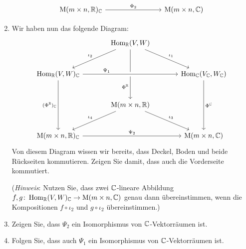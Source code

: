 \documentclass[a4paper,10pt]{scrartcl}
\begin{document}
\begin{question}
\begin{enumerate}[leftmargin=*]
\[\begin{tikzcd}[row sep = large, column sep = large, ampersand replacement = \&]
              \&  {}
          \\
                  \Mat(m \times n, \Rbb)_\Cbb \arrow{rr}{\Phi_2}
              \&  {}
              \&  \Mat(m \times n, \Cbb)
        \end{tikzcd}
      \]
    \item
      Wir haben nun das folgende Diagram:
      \[
        \begin{tikzcd}[row sep = large, column sep = large, ampersand replacement = \&]
                  {}
              \&  \Hom_\Rbb(V, W)               \arrow[swap]{ld}{\iota_2}
                                                \arrow{rd}{\iota_1}
                                                \arrow[near end, swap]{dd}{\Phi^\Rbb}
              \&  {}
          \\
                  \Hom_\Rbb(V, W)_\Cbb          \arrow[crossing over, near start]{rr}{\Psi_1}
                                                \arrow[swap]{dd}{(\Phi^\Rbb)_\Cbb}
              \&  {}
              \&  \Hom_\Cbb(V_\Cbb, W_\Cbb)     \arrow{dd}{\Phi^\Cbb}
          \\
                  {}
              \&  \Mat(m \times n, \Rbb)        \arrow[swap]{ld}{\iota_4}
                                                \arrow{rd}{\iota_3}
              \&  {}
          \\
                  \Mat(m \times n, \Rbb)_\Cbb   \arrow{rr}{\Psi_2}
              \&  {}
              \&  \Mat(m \times n, \Cbb)
        \end{tikzcd}
      \]
      Von diesem Diagram wissen wir bereits, dass Deckel, Boden und beide Rückseiten kommutieren.
      Zeigen Sie damit, dass auch die Vorderseite kommutiert.
      
      (\emph{Hinweis}:
       Nutzen Sie, dass zwei $\mathbb{C}$-lineare Abbildung $f, g \colon \operatorname{Hom}_{\mathbb{R}}(V, W)_{\mathbb{C}} \to \operatorname{M}(m \times n, \mathbb{C})$ genau dann übereinstimmen, wenn die Kompositionen $f \circ \iota_2$ und $g \circ \iota_2$ übereinstimmen.)
    \item
      Zeigen Sie, dass $\Psi_2$ ein Isomorphismus von $\mathbb{C}$-Vektorräumen ist.
    \item
      Folgen Sie, dass auch $\Psi_1$ ein Isomorphismus von $\mathbb{C}$-Vektorräumen ist.
  \end{enumerate}
\end{question}
\end{document}
